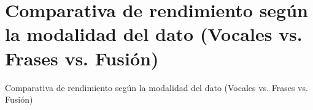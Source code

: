 \section{Comparativa de rendimiento según la modalidad del dato (Vocales vs. Frases vs. Fusión)}
    Comparativa de rendimiento según la modalidad del dato (Vocales vs. Frases vs. Fusión)
